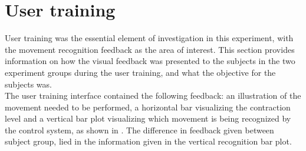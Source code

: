 
\section{User training} \label{sec:M:usertraining}
User training was the essential element of investigation in this experiment, with the movement recognition feedback as the area of interest. This section provides information on how the visual feedback was presented to the subjects in the two experiment groups during the user training, and what the objective for the subjects was. \\
The user training interface contained the following feedback: an illustration of the movement needed to be performed, a horizontal bar visualizing the contraction level and a vertical bar plot visualizing which movement is being recognized by the control system, as shown in . The difference in feedback given between subject group, lied in the information given in the vertical recognition bar plot.

